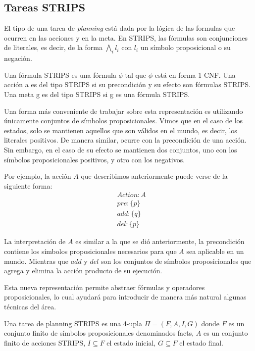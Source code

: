 \subsection{Tareas STRIPS}

El tipo de una tarea de \emph{planning} está dada por la lógica de las formulas
que ocurren en las acciones y en la meta. En STRIPS, las fórmulas son
conjunciones de literales, es decir, de la forma $\bigwedge_i l_i$ con $l_i$
un símbolo proposicional o su negación.

\begin{mydef}
    Una fórmula STRIPS es una fórmula $\phi$ tal que $\phi$ está en forma 1-CNF.
    Una acción a es del tipo STRIPS si su precondición y su efecto son fórmulas
    STRIPS. Una meta g es del tipo STRIPS si g es una fórmula STRIPS.
\end{mydef}

Una forma más conveniente de trabajar sobre esta representación es utilizando
únicamente conjuntos de símbolos proposicionales. Vimos que en el caso de los
estados, solo se mantienen aquellos que son válidos en el mundo, es decir, los
literales positivos. De manera similar, ocurre con la precondición de una
acción. Sin embargo, en el caso de su efecto se mantienen dos conjuntos, uno
con los símbolos proposicionales positivos, y otro con los negativos.

Por ejemplo, la acción $A$ que describimos anteriormente puede verse
de la siguiente forma:
\begin{align*}
    & Action : A \\
    & pre : \{ p \}\\
    & add : \{ q \}\\
    & del : \{ p \}
\end{align*}

La interpretación de $A$ es similar a la que se dió anteriormente, la
precondición contiene los símbolos proposicionales necesarios para que $A$ sea
aplicable en un mundo. Mientras que $add$ y $del$ son los conjuntos de símbolos
proposicionales que agrega y elimina la acción producto de su ejecución.

Esta nueva representación permite abstraer fórmulas y operadores
proposicionales, lo cual ayudará para introducir de manera más natural algunas
técnicas del área.

\begin{mydef}
    Una tarea de planning STRIPS es una 4-upla $\Pi = (F, A, I, G)$ donde $F$ es
    un conjunto finito de símbolos proposicionales denominados facts, $A$ es un
    conjunto finito de acciones STRIPS, $I \subseteq F$ el estado inicial, $G
    \subseteq F$ el estado final.
\end{mydef}

